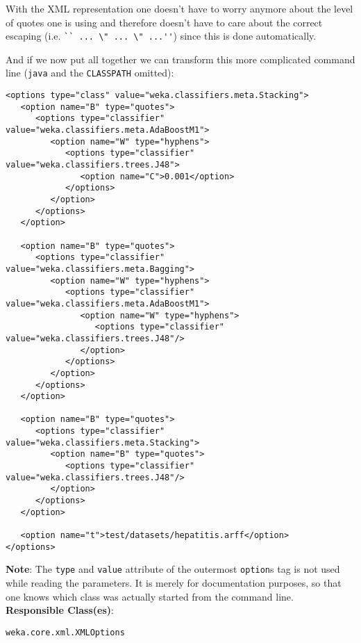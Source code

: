 \begin{itemize}
\noindent With the XML representation one doesn't have to worry
anymore about the level of quotes one is using and therefore doesn't
have to care about the correct escaping (i.e. \verb=`` ... \" ... \" ...''=)
since this is done automatically.

\newpage
And if we now put all together we can transform this more complicated
command line (\verb=java= and the \verb=CLASSPATH= omitted):

{\small \begin{verbatim}
<options type="class" value="weka.classifiers.meta.Stacking">
   <option name="B" type="quotes">
      <options type="classifier" value="weka.classifiers.meta.AdaBoostM1">
         <option name="W" type="hyphens">
            <options type="classifier" value="weka.classifiers.trees.J48">
               <option name="C">0.001</option>
            </options>
         </option>
      </options>
   </option>
   
   <option name="B" type="quotes">
      <options type="classifier" value="weka.classifiers.meta.Bagging">
         <option name="W" type="hyphens">
            <options type="classifier" value="weka.classifiers.meta.AdaBoostM1">
               <option name="W" type="hyphens">
                  <options type="classifier" value="weka.classifiers.trees.J48"/>
               </option>
            </options>
         </option>
      </options>
   </option>

   <option name="B" type="quotes">
      <options type="classifier" value="weka.classifiers.meta.Stacking">
         <option name="B" type="quotes">
            <options type="classifier" value="weka.classifiers.trees.J48"/>
         </option>
      </options>
   </option>

   <option name="t">test/datasets/hepatitis.arff</option>
</options>
\end{verbatim}}
\end{itemize}

\noindent \textbf{Note}: The \verb=type= and \verb=value= attribute of the outermost
\verb=option=s tag is not used while reading the parameters. It is merely for
documentation purposes, so that one knows which class was actually
started from the command line.\\

\noindent \textbf{Responsible Class(es)}:

\begin{verbatim}
weka.core.xml.XMLOptions
\end{verbatim}

